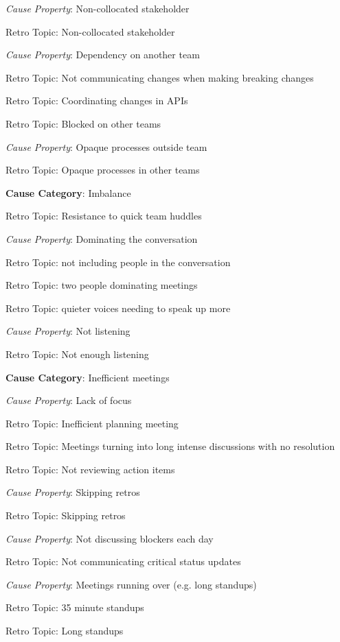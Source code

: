 \quad \quad \textit{Cause Property}: Non-collocated stakeholder

\quad \quad \quad Retro Topic: Non-collocated stakeholder

\quad \quad \textit{Cause Property}: Dependency on another team

\quad \quad \quad Retro Topic: Not communicating changes when making breaking changes

\quad \quad \quad Retro Topic: Coordinating changes in APIs

\quad \quad \quad Retro Topic: Blocked on other teams

\quad \quad \textit{Cause Property}: Opaque processes outside team

\quad \quad \quad Retro Topic: Opaque processes in other teams

\quad \textbf{Cause Category}: Imbalance

\quad \quad Retro Topic: Resistance to quick team huddles

\quad \quad \textit{Cause Property}: Dominating the conversation

\quad \quad \quad Retro Topic: not including people in the conversation

\quad \quad \quad Retro Topic: two people dominating meetings

\quad \quad \quad Retro Topic: quieter voices needing to speak up more

\quad \quad \textit{Cause Property}: Not listening

\quad \quad \quad Retro Topic: Not enough listening

\quad \textbf{Cause Category}: Inefficient meetings

\quad \quad \textit{Cause Property}: Lack of focus

\quad \quad \quad Retro Topic: Inefficient planning meeting

\quad \quad \quad Retro Topic: Meetings turning into long intense discussions with no resolution

\quad \quad \quad Retro Topic: Not reviewing action items

\quad \quad \textit{Cause Property}: Skipping retros

\quad \quad \quad Retro Topic: Skipping retros

\quad \quad \textit{Cause Property}: Not discussing blockers each day

\quad \quad \quad Retro Topic: Not communicating critical status updates

\quad \quad \textit{Cause Property}: Meetings running over (e.g. long standups)

\quad \quad \quad Retro Topic: 35 minute standups

\quad \quad \quad Retro Topic: Long standups


